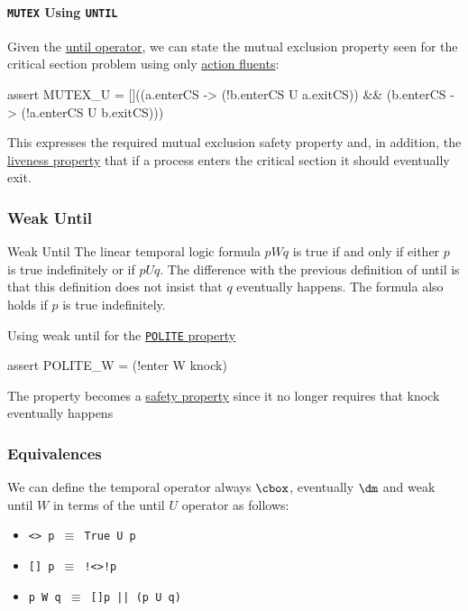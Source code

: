 \paragraph{\texttt{MUTEX} Using \texttt{UNTIL}}\label{par:an_texttt_mutex_using_texttt_until} %
Given the \hyperref[sub:an_until_operator]{until operator}, we can state the mutual exclusion property seen for the critical section problem using only \hyperref[sub:an_action_fluents]{action fluents}:
\begin{codeblock}[fsp]{}
    assert MUTEX_U =
        []((a.enterCS -> (!b.enterCS U a.exitCS)) &&
        (b.enterCS -> (!a.enterCS U b.exitCS)))
\end{codeblock}
This expresses the required mutual exclusion safety property and, in addition, the \hyperref[def:liveness-prop]{liveness property} that if a process enters the critical section it should eventually exit.
%
%
\subsubsection{Weak Until}\label{sub:an_weak_until} %
\begin{definition}{Weak Until}{}
    The linear temporal logic formula $p W q$ is true if and only if either $p$ is true indefinitely or if $p U q$.
    The difference with the previous definition of until is that this definition does not insist that $q$ eventually happens. The formula also holds if $p$ is true indefinitely.
\end{definition}
\begin{example}{Using weak until for the \hyperref[ex:polit-prop]{\texttt{POLITE} property}}{}
    \begin{codeblock}[fsp]{}
    assert POLITE_W = (!enter W knock)
    \end{codeblock}
    \begin{warning}
        The property becomes a \hyperref[def:safety-prop]{safety property} since it no longer requires that knock eventually happens
    \end{warning}
\end{example}
%
\subsubsection{Equivalences}\label{sub:an_equivalences} %
We can define the temporal operator always $\cbox$, eventually $\dm$ and weak until $W$ in terms of the until $U$ operator as follows:
\begin{itemize}
    \item[] \texttt{<> p $\equiv$ True U p}
    \item[] \texttt{[] p $\equiv$ !<>!p}
    \item[] \texttt{p W q $\equiv$ []p || (p U q)}
\end{itemize}
%

